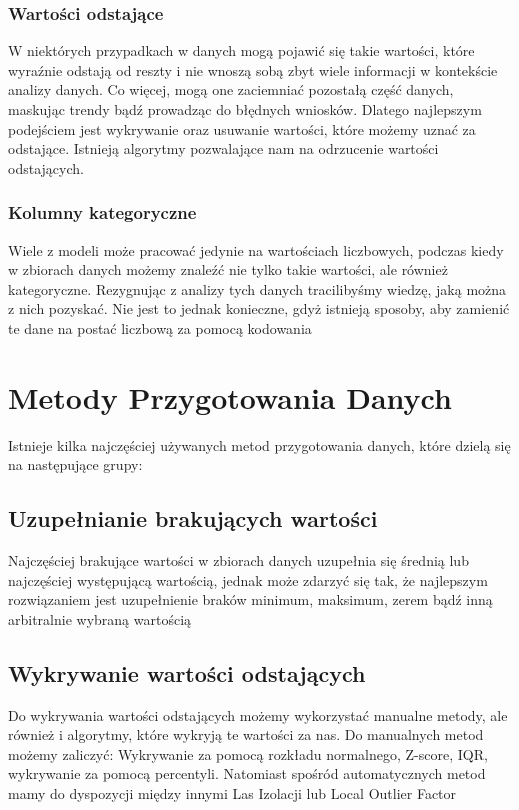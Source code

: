 \documentclass{book}
\begin{document}
\subsection{Wartości odstające}
W niektórych przypadkach w danych mogą pojawić się takie wartości, 
które wyraźnie odstają od reszty i nie wnoszą sobą zbyt wiele 
informacji w kontekście analizy danych. Co więcej, mogą one 
zaciemniać pozostałą część danych, maskując trendy bądź prowadząc 
do błędnych wniosków. Dlatego najlepszym podejściem jest wykrywanie 
oraz usuwanie wartości, które możemy uznać za odstające. 
Istnieją algorytmy pozwalające nam na odrzucenie wartości odstających.
\subsection{Kolumny kategoryczne}
Wiele z modeli może pracować jedynie na wartościach liczbowych, 
podczas kiedy w zbiorach danych możemy znaleźć nie tylko takie wartości, 
ale również kategoryczne. Rezygnując z analizy tych danych tracilibyśmy 
wiedzę, jaką można z nich pozyskać. Nie jest to jednak konieczne, 
gdyż istnieją sposoby, aby zamienić te dane na postać liczbową za 
pomocą kodowania


\chapter{Metody Przygotowania Danych}
Istnieje kilka najczęściej używanych metod przygotowania danych, 
które dzielą się na następujące grupy:

\section{Uzupełnianie brakujących wartości}
Najczęściej brakujące wartości w zbiorach danych uzupełnia się średnią 
lub najczęściej występującą wartością, jednak może zdarzyć się tak, 
że najlepszym rozwiązaniem jest uzupełnienie braków minimum, maksimum, 
zerem bądź inną arbitralnie wybraną wartością
\section{Wykrywanie wartości odstających}
Do wykrywania wartości odstających możemy wykorzystać manualne metody, 
ale również i algorytmy, które wykryją te wartości za nas. 
Do manualnych metod możemy zaliczyć: Wykrywanie za pomocą rozkładu 
normalnego, Z-score, IQR, wykrywanie za pomocą percentyli. 
Natomiast spośród automatycznych metod mamy do dyspozycji między innymi 
Las Izolacji lub Local Outlier Factor
\end{document}
